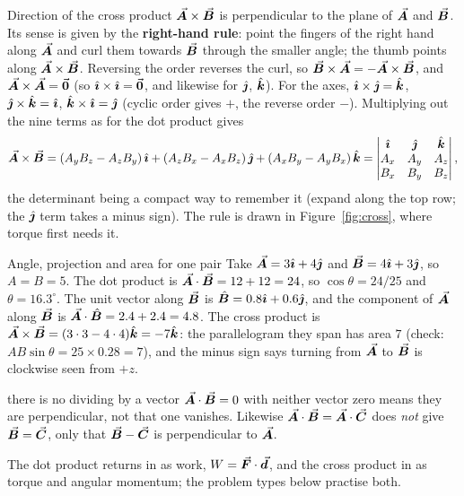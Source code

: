 \begin{keybox}{Direction of the cross product}
$\vec{\bm{A}}\times\vec{\bm{B}}$ is perpendicular to the plane of $\vec{\bm{A}}$ and $\vec{\bm{B}}$. Its sense is given by the
\textbf{right-hand rule}: point the fingers of the right hand along $\vec{\bm{A}}$ and curl them towards
$\vec{\bm{B}}$ through the smaller angle; the thumb points along $\vec{\bm{A}}\times\vec{\bm{B}}$. Reversing the order
reverses the curl, so $\vec{\bm{B}}\times\vec{\bm{A}}=-\vec{\bm{A}}\times\vec{\bm{B}}$, and $\vec{\bm{A}}\times\vec{\bm{A}}=\vec{\bm{0}}$ (so
$\hat{\bm{\imath}}\times\hat{\bm{\imath}}=\vec{\bm{0}}$, and likewise for $\hat{\bm{\jmath}}$, $\hat{\bm{k}}$). For the axes,
$\hat{\bm{\imath}}\times\hat{\bm{\jmath}}=\hat{\bm{k}}$, $\hat{\bm{\jmath}}\times\hat{\bm{k}}=\hat{\bm{\imath}}$, $\hat{\bm{k}}\times\hat{\bm{\imath}}=\hat{\bm{\jmath}}$ (cyclic order gives $+$, the
reverse order $-$). Multiplying out the nine terms as for the dot product gives
\[
\vec{\bm{A}}\times\vec{\bm{B}}=(A_yB_z-A_zB_y)\,\hat{\bm{\imath}}+(A_zB_x-A_xB_z)\,\hat{\bm{\jmath}}+(A_xB_y-A_yB_x)\,\hat{\bm{k}}
=\begin{vmatrix}\hat{\bm{\imath}}&\hat{\bm{\jmath}}&\hat{\bm{k}}\\ A_x&A_y&A_z\\ B_x&B_y&B_z\end{vmatrix},
\]
the determinant being a compact way to remember it (expand along the top row; the $\hat{\bm{\jmath}}$ term takes a
minus sign). The rule is drawn in Figure~\ref{fig:cross}, where
torque first needs it.
\end{keybox}

\begin{exbox}{Angle, projection and area for one pair}
Take $\vec{\bm{A}}=3\hat{\bm{\imath}}+4\hat{\bm{\jmath}}$ and $\vec{\bm{B}}=4\hat{\bm{\imath}}+3\hat{\bm{\jmath}}$, so $A=B=5$. The dot product is
$\vec{\bm{A}}\cdot\vec{\bm{B}}=12+12=24$, so $\cos\theta=24/25$ and $\theta=16.3^\circ$. The unit vector along
$\vec{\bm{B}}$ is $\hat{\bm{B}}=0.8\hat{\bm{\imath}}+0.6\hat{\bm{\jmath}}$, and the component of $\vec{\bm{A}}$ along $\vec{\bm{B}}$ is
$\vec{\bm{A}}\cdot\hat{\bm{B}}=2.4+2.4=4.8$. The cross product is $\vec{\bm{A}}\times\vec{\bm{B}}=(3\cdot3-4\cdot4)\hat{\bm{k}}=-7\hat{\bm{k}}$:
the parallelogram they span has area $7$ (check: $AB\sin\theta=25\times0.28=7$), and the minus sign
says turning from $\vec{\bm{A}}$ to $\vec{\bm{B}}$ is clockwise seen from $+z$. 
\end{exbox}

\begin{trapbox}{there is no dividing by a vector}
$\vec{\bm{A}}\cdot\vec{\bm{B}}=0$ with neither vector zero means they are perpendicular, not that one vanishes.
Likewise $\vec{\bm{A}}\cdot\vec{\bm{B}}=\vec{\bm{A}}\cdot\vec{\bm{C}}$ does \emph{not} give
$\vec{\bm{B}}=\vec{\bm{C}}$, only that $\vec{\bm{B}}-\vec{\bm{C}}$ is perpendicular to $\vec{\bm{A}}$.
\end{trapbox}

The dot product returns in  as work, $W=\vec{\bm{F}}\cdot\vec{\bm{d}}$, and the cross product in
 as torque and angular momentum; the problem types below practise both.

